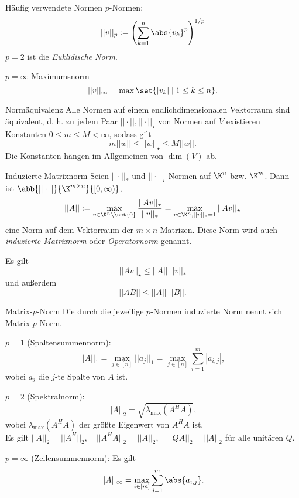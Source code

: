 \begin{karte}{Häufig verwendete Normen}
    \( p \)-Normen:
    \[ ||v||_p := \left( \sum_{k=1}^n \abs{v_k}^p \right)^{1/p} \]
    \( p = 2 \) ist die \textit{Euklidische Norm}.

    \( p = \infty \) Maximumsnorm
    \[ ||v||_\infty = \max\set{|v_k| \;|\; 1 \leq k \leq n}. \]
\end{karte}

\begin{karte}{Normäquivalenz}
    Alle Normen auf einem endlichdimensionalen Vektorraum sind äquivalent, d. h. 
    zu jedem Paar \( || \cdot ||, || \cdot ||_\star \) von Normen auf \(V\) 
    existieren Konstanten \( 0 \leq m \leq M < \infty \), sodass gilt 
    \[ m ||w|| \leq ||w||_\star \leq M||w||. \]
    Die Konstanten hängen im Allgemeinen von \( \dim(V) \) ab.
\end{karte}

\begin{karte}{Induzierte Matrixnorm}
    Seien \( ||\cdot||_* \) und \( ||\cdot||_\star \) Normen auf 
    \( \K^n \) bzw. \( \K^m \). Dann ist \( \abb{|| \cdot||}{\K^{m\times n}}{[0,\infty)} \), 
    \[ ||A|| := \max_{v\in\K^n\setminus\set{0}} \frac{||Av||_\star}{||v||_*} = \max_{v\in\K^n, ||v||_* = 1} ||Av||_\star \]
    eine Norm auf dem Vektorraum der \( m\times n \)-Matrizen. Diese Norm wird auch \textit{induzierte 
    Matrixnorm} oder \textit{Operatornorm} genannt.

    Es gilt 
    \[ ||Av||_\star \leq ||A|| \; ||v||_* \]
    und außerdem 
    \[ ||AB|| \leq ||A|| \; ||B||. \]
\end{karte}

\begin{karte}{Matrix-\(p\)-Norm}
    Die durch die jeweilige \(p\)-Normen induzierte Norm nennt sich Matrix-\(p\)-Norm.
    
    \( p=1 \) (Spaltensummennorm): 
    \[ ||A||_1 = \max_{j\in[n]} ||a_j||_1 = \max_{j\in[n]} \sum_{i=1}^m |a_{i,j}|,  \]
    wobei \( a_j \) die \(j\)-te Spalte von \(A\) ist.

    \( p=2 \) (Spektralnorm):
    \[ ||A||_2 = \sqrt{\lambda_{\max}(A^H A)}, \]
    wobei \( \lambda_{\max}(A^H A) \) der größte Eigenwert von \( A^H A \) ist.\\
    Es gilt 
    \( ||A||_2 = ||A^H||_2, \quad ||A^H A||_2 = ||A||_2, \quad ||QA||_2 = ||A||_2 \) für alle unitären  \(Q\). 

    \( p=\infty \) (Zeilensummennorm):
    Es gilt 
    \[ ||A||_\infty = \max_{i\in[m]} \sum_{j=1}^m \abs{a_{i,j}}. \]
\end{karte}

